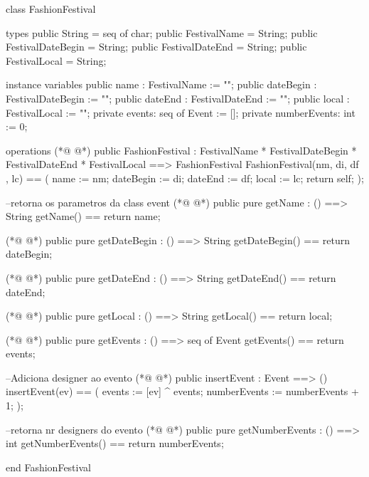 \begin{vdmpp}[breaklines=true]
class FashionFestival
 
types
 public String = seq of char;
 public FestivalName = String;
 public FestivalDateBegin = String;
 public FestivalDateEnd = String;
 public FestivalLocal = String;

instance variables
 public  name : FestivalName := "";
 public  dateBegin : FestivalDateBegin := "";
 public  dateEnd : FestivalDateEnd := "";
 public  local : FestivalLocal := "";
 private  events: seq of Event := [];
 private  numberEvents: int := 0; 
 
operations
(*@
\label{FashionFestival:19}
@*)
 public FashionFestival : 
              FestivalName *
              FestivalDateBegin * 
              FestivalDateEnd *
              FestivalLocal            
              ==> FashionFestival
  FashionFestival(nm, di, df , lc) ==
  (
    name := nm;
    dateBegin := di;
    dateEnd := df;
    local := lc;    
    return self;
  );
  
  --retorna os parametros da class event
(*@
\label{getName:35}
@*)
  public pure getName : () ==> String
    getName() == return name;
    
(*@
\label{getDateBegin:38}
@*)
   public pure getDateBegin : () ==> String
     getDateBegin() == return dateBegin;
  
(*@
\label{getDateEnd:41}
@*)
  public pure getDateEnd : () ==> String
     getDateEnd() == return dateEnd;
     
(*@
\label{getLocal:44}
@*)
  public pure getLocal : () ==> String
     getLocal() == return local;
  
(*@
\label{getEvents:47}
@*)
  public pure getEvents : () ==> seq of Event
     getEvents() == return events;
     
 --Adiciona designer ao evento
(*@
\label{insertEvent:51}
@*)
 public insertEvent : Event ==> ()
  insertEvent(ev) ==
  (
    events := [ev] ^ events;
    numberEvents := numberEvents + 1;
  );
  
 --retorna nr designers do evento
(*@
\label{getNumberEvents:59}
@*)
  public pure getNumberEvents : () ==> int
  getNumberEvents() == return numberEvents;
  
end FashionFestival
\end{vdmpp}
\bigskip
